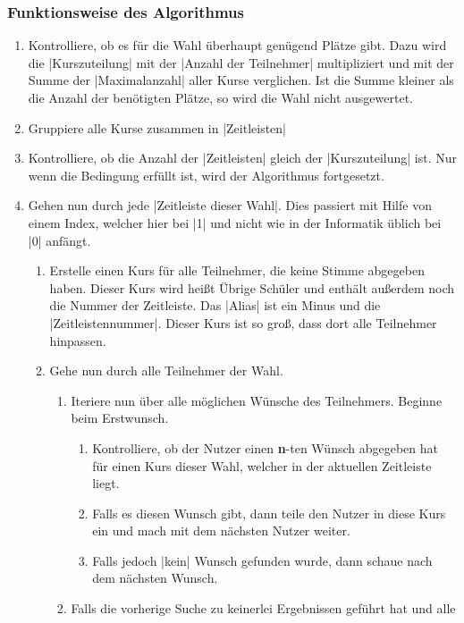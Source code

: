 \documentclass[ngerman]{ltxdoc}
\begin{document}
\subsubsection{Funktionsweise des Algorithmus}

\begin{enumerate}
  \item Kontrolliere, ob es für die Wahl überhaupt genügend Plätze gibt. Dazu
  wird die |Kurszuteilung| mit der |Anzahl der Teilnehmer| multipliziert und mit
  der Summe der |Maximalanzahl| aller Kurse verglichen. Ist die Summe kleiner
  als die Anzahl der benötigten Plätze, so wird die Wahl nicht ausgewertet.
  \item Gruppiere alle Kurse zusammen in |Zeitleisten|
  \item Kontrolliere, ob die Anzahl der |Zeitleisten| gleich der |Kurszuteilung|
  ist. Nur wenn die Bedingung erfüllt ist, wird der Algorithmus fortgesetzt.
  \item Gehen nun durch jede |Zeitleiste dieser Wahl|. Dies passiert mit Hilfe von
  einem Index, welcher hier bei |1| und nicht wie in der Informatik üblich bei |0|
  anfängt.
  \begin{enumerate}
    \item Erstelle einen Kurs für alle Teilnehmer, die keine Stimme abgegeben
    haben. Dieser Kurs wird heißt \glqq Übrige Schüler\grqq{} und enthält außerdem
    noch die Nummer der Zeitleiste. Das |Alias| ist ein Minus und die |Zeitleistennummer|.
    Dieser Kurs ist so groß, dass dort alle Teilnehmer hinpassen.
    \item Gehe nun durch alle Teilnehmer der Wahl.
    \begin{enumerate}
      \item Iteriere nun über alle möglichen Wünsche des Teilnehmers. Beginne
      beim Erstwunsch.
      \begin{enumerate}
        \item Kontrolliere, ob der Nutzer einen \textbf{n}-ten Wünsch abgegeben hat
        für einen Kurs dieser Wahl, welcher in der aktuellen Zeitleiste liegt.
        \item Falls es diesen Wunsch gibt, dann teile den Nutzer in diese Kurs ein
        und mach mit dem nächsten Nutzer weiter.
        \item Falls jedoch |kein| Wunsch gefunden wurde, dann schaue nach dem nächsten
        Wunsch.
      \end{enumerate}
      \item Falls die vorherige Suche zu keinerlei Ergebnissen geführt hat und alle

\end{enumerate}
\end{enumerate}
\end{enumerate}
\end{document}
